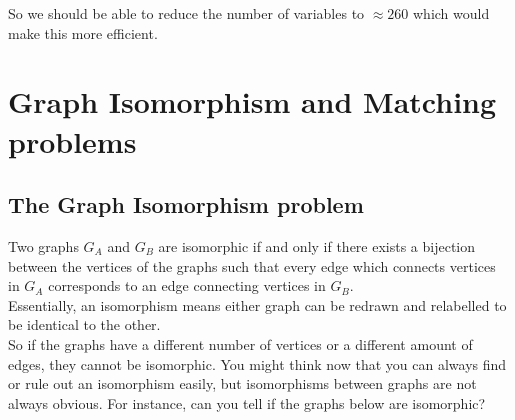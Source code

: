 \documentclass{article}
\begin{document}
\noindent So we should be able to reduce the number of variables to \(\approx 260\) which would make this more efficient. 

\section{Graph Isomorphism and Matching problems}
\subsection{The Graph Isomorphism problem}
Two graphs \(G_A\) and \(G_B\) are isomorphic if and only if there exists a bijection between the vertices of the graphs such that every edge which connects vertices in \(G_A\) corresponds to an edge connecting vertices in \(G_B\). \\
Essentially, an isomorphism means either graph can be redrawn and relabelled to be identical to the other. \\

\noindent So if the graphs have a different number of vertices or a different amount of edges, they cannot be isomorphic. You might think now that you can always find or rule out an isomorphism easily, but isomorphisms between graphs are not always obvious. For instance, can you tell if the graphs below are isomorphic?\\
\end{document}
